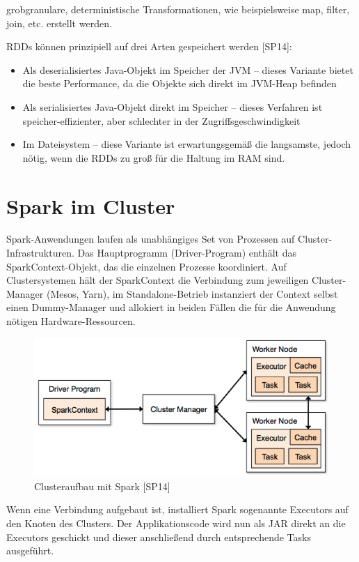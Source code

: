 grobgranulare, deterministische Transformationen, wie beispielsweise map, filter, join, etc. erstellt werden. 

RDDs können prinzipiell auf drei Arten gespeichert werden [SP14]:
\begin{itemize}
		\item Als deserialisiertes Java-Objekt im Speicher der JVM – dieses Variante bietet die beste Performance, da die Objekte sich direkt im JVM-Heap befinden
		\item Als serialisiertes Java-Objekt direkt im Speicher – dieses Verfahren ist speicher-effizienter, aber schlechter in der Zugriffsgeschwindigkeit
		\item Im Dateisystem – diese Variante ist erwartungsgemäß die langsamste, jedoch nötig, wenn die RDDs zu groß für die Haltung im RAM sind. 		
\end{itemize}	





\section{Spark im Cluster}
\label{section:spark im cluster}


Spark-Anwendungen laufen als unabhängiges Set von Prozessen auf Cluster-Infrastrukturen. Das Hauptprogramm (Driver-Program) enthält das SparkContext-Objekt, das die einzelnen Prozesse koordiniert. Auf Clustersystemen hält der SparkContext die Verbindung zum jeweiligen Cluster-Manager (Mesos, Yarn), im Standalone-Betrieb instanziert der Context selbst einen Dummy-Manager und allokiert in beiden Fällen die für die Anwendung nötigen Hardware-Ressourcen.    

\begin{figure}[htb!]
\centering
\includegraphics[width=1.0\textwidth]{bilder/3_2_cluster.png}
\caption{Clusteraufbau mit Spark [SP14]}
\label{fig:sparkcluster}
\end{figure} 






Wenn eine Verbindung aufgebaut ist, installiert Spark sogenannte Executors auf den Knoten des Clusters. Der Applikationscode wird nun als JAR direkt an die Executors geschickt und dieser anschließend durch entsprechende Tasks ausgeführt. 
































